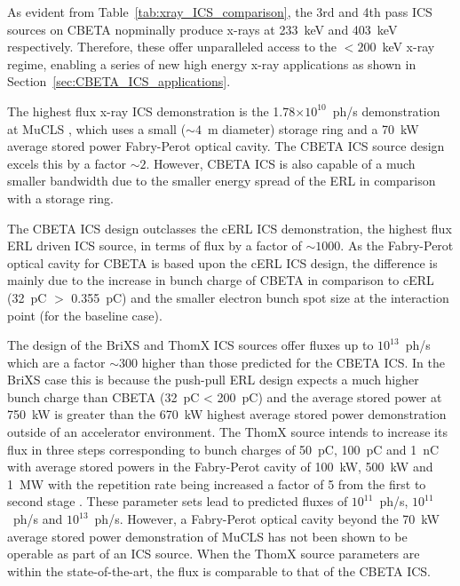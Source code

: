 \documentclass[../main.tex]{subfiles}
\begin{document}
As evident from Table~\ref{tab:xray_ICS_comparison}, the 3rd and 4th pass ICS sources on CBETA nopminally produce x-rays at 233~\si{\kilo\electronvolt} and 403~\si{\kilo\electronvolt} respectively. Therefore, these offer unparalleled access to the $< 200$~\si{\kilo\electronvolt} x-ray regime, enabling a series of new high energy x-ray applications as shown in Section~\ref{sec:CBETA_ICS_applications}.

The highest flux x-ray ICS demonstration is the 1.78$\times 10^{10}$~ph/\si{\second} demonstration at MuCLS \cite{eggl2016munich}, which uses a small ($\sim4$~\si{\meter} diameter) storage ring and a 70~\si{\kilo\watt} average stored power Fabry-Perot optical cavity. The CBETA ICS source design excels this by a factor $\sim2$. However, CBETA ICS is also capable of a much smaller bandwidth due to the smaller energy spread of the ERL in comparison with a storage ring.

The CBETA ICS design outclasses the cERL ICS demonstration, the highest flux ERL driven ICS source, in terms of flux by a factor of $\sim1000$. As the Fabry-Perot optical cavity for CBETA is based upon the cERL ICS design, the difference is mainly due to the increase in bunch charge of CBETA in comparison to cERL (32~\si{\pico\coulomb} $>$ 0.355~\si{\pico\coulomb}) and the smaller electron bunch spot size at the interaction point (for the baseline case).

The design of the BriXS and ThomX ICS sources offer fluxes up to $10^{13}$~ph/\si{\second} which are a factor $\sim300$ higher than those predicted for the CBETA ICS. In the BriXS case this is because the push-pull ERL design expects a much higher bunch charge than CBETA (32~\si{\pico\coulomb} < 200~\si{\pico\coulomb}) \cite{drebot2019brixs} and the average stored power at 750~\si{\kilo\watt} \cite{drebot2019brixs} is greater than the 670~\si{\kilo\watt} highest average stored power demonstration \cite{carstens2014megawatt} outside of an accelerator environment. The ThomX source intends to increase its flux in three steps corresponding to bunch charges of 50~\si{\pico\coulomb}, 100~\si{\pico\coulomb} and 1~\si{\nano\coulomb} with average stored powers in the Fabry-Perot cavity of 100~\si{\kilo\watt}, 500~\si{\kilo\watt} and 1~\si{\mega\watt} with the repetition rate being increased a factor of 5 from the first to second stage \cite{dupraz2020thomx}. These parameter sets lead to predicted fluxes of $10^{11}$~ph/\si{\second}, $10^{11}$~ph/\si{\second} and $10^{13}$~ph/\si{\second}. However, a Fabry-Perot optical cavity beyond the 70~\si{\kilo\watt} average stored power demonstration of MuCLS \cite{eggl2016munich} has not been shown to be operable as part of an ICS source. When the ThomX source parameters are within the state-of-the-art, the flux is comparable to that of the CBETA ICS.   
\end{document}
